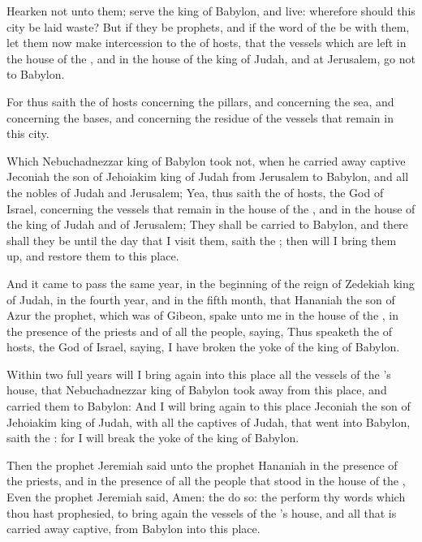 \Verse Hearken not unto them; serve the king of Babylon, and live: wherefore should this city be laid waste?  \Verse But if they be prophets, and if the word of the \LORD be with them, let them now make intercession to the \LORD of hosts, that the vessels which are left in the house of the \LORD, and in the house of the king of Judah, and at Jerusalem, go not to Babylon.

\Verse For thus saith the \LORD of hosts concerning the pillars, and concerning the sea, and concerning the bases, and concerning the residue of the vessels that remain in this city.

\Verse Which Nebuchadnezzar king of Babylon took not, when he carried away captive Jeconiah the son of Jehoiakim king of Judah from Jerusalem to Babylon, and all the nobles of Judah and Jerusalem; \Verse Yea, thus saith the \LORD of hosts, the God of Israel, concerning the vessels that remain in the house of the \LORD, and in the house of the king of Judah and of Jerusalem; \Verse They shall be carried to Babylon, and there shall they be until the day that I visit them, saith the \LORD; then will I bring them up, and restore them to this place.


\Chapter
\Verse And it came to pass the same year, in the beginning of the reign of Zedekiah king of Judah, in the fourth year, and in the fifth month, that Hananiah the son of Azur the prophet, which was of Gibeon, spake unto me in the house of the \LORD, in the presence of the priests and of all the people, saying, \Verse Thus speaketh the \LORD of hosts, the God of Israel, saying, I have broken the yoke of the king of Babylon.

\Verse Within two full years will I bring again into this place all the vessels of the \LORD's house, that Nebuchadnezzar king of Babylon took away from this place, and carried them to Babylon: \Verse And I will bring again to this place Jeconiah the son of Jehoiakim king of Judah, with all the captives of Judah, that went into Babylon, saith the \LORD: for I will break the yoke of the king of Babylon.

\Verse Then the prophet Jeremiah said unto the prophet Hananiah in the presence of the priests, and in the presence of all the people that stood in the house of the \LORD, \Verse Even the prophet Jeremiah said, Amen: the \LORD do so: the \LORD perform thy words which thou hast prophesied, to bring again the vessels of the \LORD's house, and all that is carried away captive, from Babylon into this place.

